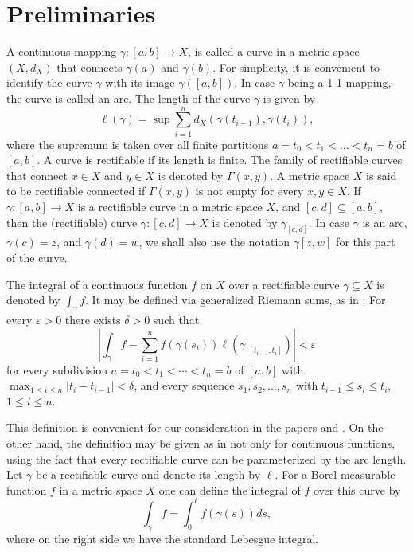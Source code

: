\documentclass{amsart}
\theoremstyle{definition}
\numberwithin{equation}{section}
\begin{document}
\section{Preliminaries}


A continuous mapping $\gamma:[a,b]\to X$, is called a curve in a metric space $(X,d_X)$ that connects $\gamma (a)$ and
$\gamma (b)$. For simplicity, it is convenient to identify the curve $\gamma$ with its image $\gamma([a,b])$. In case
$\gamma$ being a 1-1 mapping, the curve is called an arc. The length of the curve $\gamma$ is given by
\begin{equation*}
\ell  (\gamma)   = \sup   \sum_{i=1}^n d_X  (\gamma(t_{i-1}),\gamma (t_i)),
\end{equation*}
where the supremum is taken over all finite partitions $a = t_0 < t_1 < \dots < t_n = b$ of $[a,b]$. A curve is
rectifiable if its length is finite. The family of rectifiable curves that connect $x\in X$ and $y\in X$ is denoted by
$\Gamma({x,y})$. A metric space $X$ is said to be rectifiable connected if $\Gamma(x,y)$ is not empty for every
$x, y\in X$. If $\gamma:[a,b]\to X$ is a rectifiable curve in a metric space $X$, and $[c,d]\subseteq [a,b]$, then the
(rectifiable) curve $\gamma:[c,d]\to X$ is denoted by $\gamma_{[c,d]}$. In case $\gamma$ is an arc, $\gamma(c) = z$,
and $\gamma (d) = w$, we shall also use the notation $\gamma [z,w]$ for this part of the curve.

The integral of a continuous function $f$ on $X$ over a rectifiable curve $\gamma\subseteq X$ is denoted by
$\int_\gamma f$. It may be defined via generalized Riemann sums, as in \cite{MARKOVIC.JGA.1}:
For every $\varepsilon>0$ there exists $\delta>0$ such that
\begin{equation*}
\left|\int_\gamma  f - \sum _{i=1}^n f (\gamma (s_i)) \ell(\gamma|_{[t_{i-1},t_i]} ) \right|<\varepsilon
\end{equation*}
for every subdivision $a=t_0<t_1<\cdots<t_n= b$ of $[a,b]$ with $\max_{1\le i\le n}|t_i-t_{i-1}|<\delta$, and every
sequence $s_1,s_2,\dots,s_n$ with $t_{i-1}\le s_i\le t_i$, $1\le i \le n$.

This definition is convenient for our consideration in the papers \cite{MARKOVIC.JGA.1} and \cite{MARKOVIC.JGA.2}.
On the other hand, the definition may be given as in \cite[Chapter V]{HEINONEN.BOOK} not only for continuous functions,
using the fact that every rectifiable curve can be parameterized by the arc length. Let $\gamma$ be a rectifiable curve
and denote its length by $\ell$. For a Borel measurable function $f$ in a metric space $X$ one can define the integral
of $f$ over this curve by
\begin{equation*}
\int _\gamma f  = \int_0^\ell f(\gamma(s))ds,
\end{equation*}
where on the right side we have the standard Lebesgue integral.
 
\end{document}
